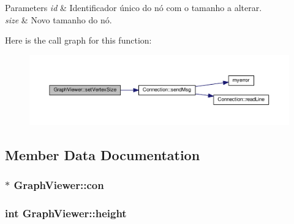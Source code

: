 \begin{DoxyParams}{Parameters}
{\em id} & Identificador único do nó com o tamanho a alterar. \\
\hline
{\em size} & Novo tamanho do nó. \\
\hline
\end{DoxyParams}


Here is the call graph for this function\+:
\nopagebreak
\begin{figure}[H]
\begin{center}
\leavevmode
\includegraphics[width=350pt]{classGraphViewer_ae930dfdfcdeb7a871eefb6028d74b9f9_cgraph}
\end{center}
\end{figure}




\subsection{Member Data Documentation}
\subsubsection[{\texorpdfstring{con}{con}}]{$\ast$ Graph\+Viewer\+::con\hspace{0.3cm}{\ttfamily [private]}}\hypertarget{classGraphViewer_a14a206f78c242e739e0908b06070ba4d}{}\label{classGraphViewer_a14a206f78c242e739e0908b06070ba4d}
\subsubsection[{\texorpdfstring{height}{height}}]{\setlength{\rightskip}{0pt plus 5cm}int Graph\+Viewer\+::height\hspace{0.3cm}{\ttfamily [private]}}\hypertarget{classGraphViewer_a9a1000e492a66ac4301c7135275690da}{}\label{classGraphViewer_a9a1000e492a66ac4301c7135275690da}
